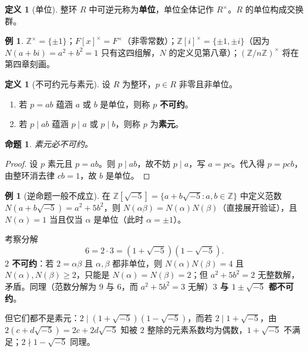 \documentclass[a4paper,11pt]{ctexart}
\numberwithin{equation}{section}
\theoremstyle{plain}
\newtheorem{proposition}[theorem]{命题}
\theoremstyle{definition}
\newtheorem{definition}[theorem]{定义}
\newtheorem{example}[theorem]{例}
\theoremstyle{remark}
\newcommand{\Z}{\mathbb{Z}}
\newcommand{\Ga}{\mathbb{Z}[i]}
\newcommand{\Gf}{\mathbb{Z}[\sqrt{-5}]}
\begin{document}
\begin{definition}[单位]\label{def:unit}
整环 $R$ 中可逆元称为\textbf{单位}，单位全体记作 $R^{\times}$。$R$ 的单位构成交换群。
\end{definition}

\begin{example}
$\Z^{\times}=\{\pm1\}$；$F[x]^{\times}=F^{\times}$（非零常数）；$\Ga^{\times}=\{\pm 1,\pm i\}$（因为 $N(a+bi)=a^2+b^2=1$ 只有这四组解，$N$ 的定义见第八章）；$(\Z/n\Z)^{\times}$ 将在第四章刻画。
\end{example}

\begin{definition}[不可约元与素元]\label{def:irredprime}
设 $R$ 为整环，$p\in R$ 非零且非单位。
\begin{enumerate}[itemsep=0.1em]
  \item 若 $p=ab$ 蕴涵 $a$ 或 $b$ 是单位，则称 $p$ \textbf{不可约}。
  \item 若 $p\mid ab$ 蕴涵 $p\mid a$ 或 $p\mid b$，则称 $p$ 为\textbf{素元}。
\end{enumerate}
\end{definition}

\begin{proposition}\label{prop:primeirred}
素元必不可约。
\end{proposition}

\begin{proof}
设 $p$ 素元且 $p=ab$。则 $p\mid ab$，故不妨 $p\mid a$，写 $a=pc$。代入得 $p=pcb$，由整环消去律 $cb=1$，故 $b$ 是单位。
\end{proof}

\begin{example}[逆命题一般不成立]\label{ex:zs5}
在 $\Gf=\{a+b\sqrt{-5}:a,b\in\Z\}$ 中定义范数 $N(a+b\sqrt{-5})=a^2+5b^2$，则 $N(\alpha\beta)=N(\alpha)N(\beta)$（直接展开验证），且 $N(\alpha)=1$ 当且仅当 $\alpha$ 是单位（此时 $\alpha=\pm1$）。

考察分解
\[
6=2\cdot 3=(1+\sqrt{-5})(1-\sqrt{-5}).
\]
\textbf{$2$ 不可约}：若 $2=\alpha\beta$ 且 $\alpha,\beta$ 都非单位，则 $N(\alpha)N(\beta)=4$ 且 $N(\alpha),N(\beta)\ge 2$，只能是 $N(\alpha)=N(\beta)=2$；但 $a^2+5b^2=2$ 无整数解，矛盾。同理（范数分解为 $9$ 与 $6$，而 $a^2+5b^2=3$ 无解）\textbf{$3$ 与 $1\pm\sqrt{-5}$ 都不可约}。

但它们都不是素元：$2\mid(1+\sqrt{-5})(1-\sqrt{-5})$，而若 $2\mid 1+\sqrt{-5}$，由 $2(c+d\sqrt{-5})=2c+2d\sqrt{-5}$ 知被 $2$ 整除的元素系数均为偶数，$1+\sqrt{-5}$ 不满足；$2\nmid 1-\sqrt{-5}$ 同理。
\end{example}
\end{document}
